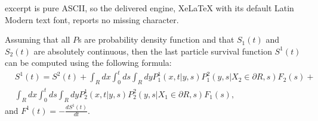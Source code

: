 \documentclass[10pt,a4paper]{amsart}
\begin{document}
excerpt is pure ASCII, so the delivered engine, XeLaTeX with its default Latin Modern text font, reports no missing character.
  \begin{theorem}
    \label{theo:two}
    Assuming that all $P$s are probability density function and that $S_1(t)$ and $S_2(t)$ are absolutely continuous, then the last particle survival function $S^1(t)$ can be computed using the following formula:
    \begin{equation}
      \label{eq:S1_general}
      \begin{aligned}
        &S^1(t)=S^2(t)+\int_Rdx\int_0^tds \int_Rdy P^1_1(x,t|y,s)P^2_1(y,s|X_2\in \partial R,s)F_{2}(s)+\\
        &\int_Rdx\int_0^tds \int_Rdy P^1_2(x,t|y,s)P^2_2(y,s|X_1\in \partial R,s)F_{1}(s),
      \end{aligned}
    \end{equation}
    and $F^1(t)=-\frac{dS^1(t)}{dt}$.
  \end{theorem}
\end{document}
